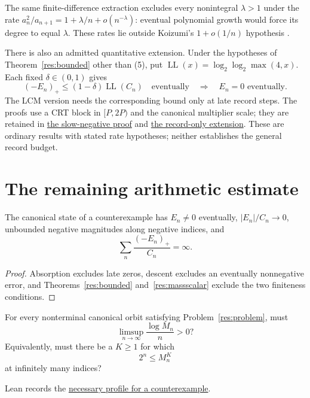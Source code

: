 \documentclass[11pt]{article}
\begin{document}
The same finite-difference extraction excludes every nonintegral
$\lambda>1$ under the rate
$a_n^2/a_{n+1}=1+\lambda/n+o(n^{-\lambda})$: eventual polynomial growth
would force its degree to equal $\lambda$. These rates lie outside
Koizumi's $1+o(1/n)$ hypothesis \cite[Remark~3]{koizumi2025}.

There is also an admitted quantitative extension. Under the hypotheses of
Theorem~\ref{res:bounded} other than (5), put
$\operatorname{LL}(x)=\log_2\log_2\max(4,x)$. Each fixed
$\delta\in(0,1)$ gives
\[
 (-E_n)_+\le(1-\delta)\operatorname{LL}(C_n)
 \quad\text{eventually}\quad\Longrightarrow\quad E_n=0\text{ eventually}.
\]
The LCM version needs the corresponding bound only at late record steps.
The proofs use a CRT block in $[P,2P)$ and the canonical multiplier scale;
they are retained in
\href{\repobase/\PX/Erdos243/SlowNegativePartRigidity.md}{the slow-negative proof}
and \href{\repobase/\PX/Erdos243/LcmRecordExcess.md\#5-record-only-subcritical-log-log-bound}
{the record-only extension}. These are ordinary results with stated rate
hypotheses; neither establishes the general record budget.

\section{The remaining arithmetic estimate}\label{sec:open}
\begin{proposition}\label{res:frontier}
The canonical state of a counterexample has $E_n\ne0$ eventually,
$|E_n|/C_n\to0$, unbounded negative magnitudes along negative indices,
and
\[
 \sum_n\frac{(-E_n)_+}{C_n}=\infty.
\]
\end{proposition}
\begin{proof}
Absorption excludes late zeros, descent excludes an eventually
nonnegative error, and Theorems~\ref{res:bounded} and~\ref{res:massscalar}
exclude the two finiteness conditions.
\end{proof}

\begin{problem}\label{res:lcmheight}
For every nonterminal canonical orbit satisfying Problem~\ref{res:problem},
must
\[
 \limsup_{n\to\infty}\frac{\log M_n}{n}>0?
\]
Equivalently, must there be a $K\ge1$ for which
\[
 2^n\le M_n^K
\]
at infinitely many indices?
\end{problem}
\noindent Lean records the \href{https://github.com/wcook04/plectis-erdos/blob/f36a98bf3d3e6f65f1074e3b800e3293d5b8a51a/ErdosProblems/Erdos243/PaperCompleteR7/Frontier.lean#L151}{necessary profile for a counterexample}.
\end{document}
